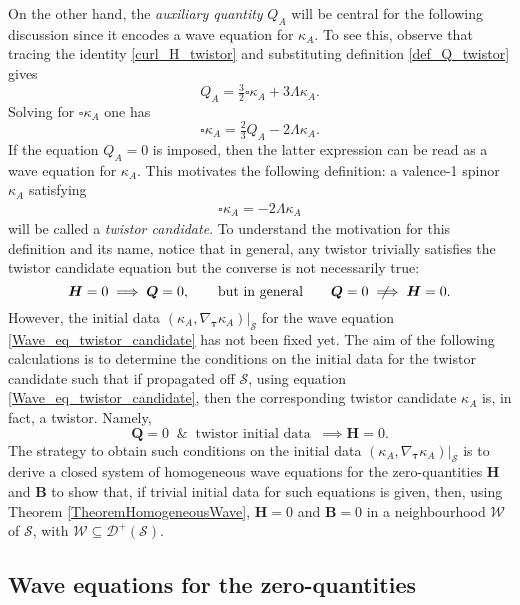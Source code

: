 \documentclass[10pt,a4paper]{article}
\theoremstyle{plain}
\def\bmB{{\bm B}}
\def\bmH{{\bm H}}
\def\bmQ{{\bm Q}}
\newcommand{\notimplies}{%
  \mathrel{{\ooalign{\hidewidth$\not\phantom{=}$\hidewidth\cr$\implies$}}}}
\begin{document}
  On the other hand, the \emph{auxiliary quantity}
  $Q_A$ will be central for the following discussion since it
  encodes a wave equation for $\kappa_A$. To see this, observe that
  tracing the identity \eqref{curl_H_twistor} and substituting 
  definition \eqref{def_Q_twistor} gives
\begin{equation}\label{Q_to_box_twistor_candidate}
Q_{A} = \tfrac{3}{2} \square \kappa _{A} + 3 \Lambda \kappa _{A}.
\end{equation}
Solving for $\square \kappa _{A}$ one has
\[
\square \kappa _{A} = \tfrac{2}{3} Q_{A} -2 \Lambda \kappa _{A}.
\]
If the equation $Q_{A}=0$ is imposed, then
the latter expression can be read as a wave equation for $\kappa_A$.
This motivates the following definition: a valence-1 spinor $\kappa_A$ satisfying
\begin{align} \label{Wave_eq_twistor_candidate}
\square \kappa_{A} = -2 \Lambda  \kappa_{A}
\end{align}
will be called a \emph{twistor candidate}. To understand the
motivation for this definition and its name, notice that in general,
any twistor trivially satisfies the twistor candidate
equation but the converse is not necessarily true:
\[
\bmH=0 \implies \bmQ =0, \qquad \text{but in general} \qquad \bmQ =0 \notimplies \bmH=0.
\]
However,  the initial data $(\kappa_A, \nabla_{\bm\tau}
\kappa_A)|_{\mathcal{S}}$ for the wave equation
\eqref{Wave_eq_twistor_candidate} has not been fixed yet. The aim of the following
calculations is to determine the conditions on the initial data for the
twistor candidate such that if propagated off $\mathcal{S}$, using
equation \eqref{Wave_eq_twistor_candidate}, then the corresponding twistor
candidate $\kappa_A$ is, in fact, a twistor. Namely,
\begin{equation}
\bmQ =0 \;\;\&\;\; \text{twistor initial data} \;\;\implies \bmH=0.
\end{equation}
The strategy to obtain such conditions on the initial data
$(\kappa_A, \nabla_{\bm\tau}
\kappa_A)|_{\mathcal{S}}$  is to derive a closed
system of homogeneous wave equations for the zero-quantities $\bmH$
and $\bmB$ to show that, if trivial initial data for such
equations is given, then, using Theorem \ref{TheoremHomogeneousWave},
$\bmH=0$ and $\bmB=0$ in a neighbourhood $\mathcal{W}$ of $\mathcal{S}$, with
$\mathcal{W}\subseteq \mathcal{D}^{+}(\mathcal{S})$.

\subsection{Wave equations for the zero-quantities}
\end{document}
